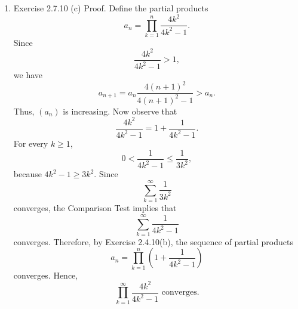 \documentclass[12pt]{article}
\begin{document}
\begin{enumerate}[label=(\alph*)]
    \item Exercise 2.7.10 (c)
          Proof. Define the partial products
          \[
              a_n=\prod_{k=1}^{n}\frac{4k^2}{4k^2-1}.
          \]
          Since
          \[
              \frac{4k^2}{4k^2-1}>1,
          \]
          we have
          \[
              a_{n+1}=a_n\frac{4(n+1)^2}{4(n+1)^2-1}>a_n.
          \]
          Thus, \((a_n)\) is increasing.
          Now observe that
          \[
              \frac{4k^2}{4k^2-1}
              =1+\frac{1}{4k^2-1}.
          \]
          For every \(k\ge1\),
          \[
              0<\frac{1}{4k^2-1}\le\frac{1}{3k^2},
          \]
          because \(4k^2-1\ge3k^2\).
          Since
          \[
              \sum_{k=1}^{\infty}\frac{1}{3k^2}
          \]
          converges, the Comparison Test implies that
          \[
              \sum_{k=1}^{\infty}\frac{1}{4k^2-1}
          \]
          converges.
          Therefore, by Exercise 2.4.10(b), the sequence of partial products
          \[
              a_n=\prod_{k=1}^{n}\left(1+\frac{1}{4k^2-1}\right)
          \]
          converges.
          Hence,
          \[
              \prod_{k=1}^{\infty}\frac{4k^2}{4k^2-1}
              \text{ converges.}
          \]

\end{enumerate}
\end{document}
